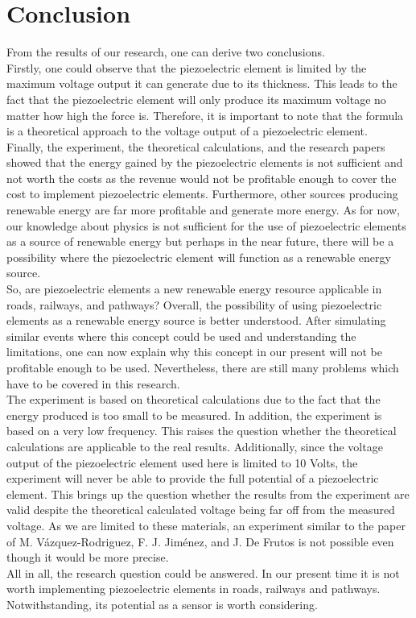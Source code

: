 \section{Conclusion}

From the results of our research, one can derive two conclusions.\\
Firstly, one could observe that the piezoelectric element is limited by the maximum voltage output it can generate due to its thickness. This leads to the fact that the piezoelectric element will only produce its maximum voltage no matter how high the force is. Therefore, it is important to note that the formula is a theoretical approach to the voltage output of a piezoelectric element.\\
Finally, the experiment, the theoretical calculations, and the research papers showed that the energy gained by the piezoelectric elements is not sufficient and not worth the costs as the revenue would not be profitable enough to cover the cost to implement piezoelectric elements. Furthermore, other sources producing renewable energy are far more profitable and generate more energy. As for now, our knowledge about physics is not sufficient for the use of piezoelectric elements as a source of renewable energy but perhaps in the near future, there will be a possibility where the piezoelectric element will function as a renewable energy source.\\
So, are piezoelectric elements a new renewable energy resource applicable in roads, railways, and pathways? Overall, the possibility of using piezoelectric elements as a renewable energy source is better understood. After simulating similar events where this concept could be used and understanding the limitations, one can now explain why this concept in our present will not be profitable enough to be used. Nevertheless, there are still many problems which have to be covered in this research.\\
The experiment is based on theoretical calculations due to the fact that the energy produced is too small to be measured. In addition, the experiment is based on a very low frequency. This raises the question whether the theoretical calculations are applicable to the real results. Additionally, since the voltage output of the piezoelectric element used here is limited to 10 Volts, the experiment will never be able to provide the full potential of a piezoelectric element. This brings up the question whether the results from the experiment are valid despite the theoretical calculated voltage being far off from the measured voltage. As we are limited to these materials, an experiment similar to the paper of M. Vázquez-Rodriguez, F. J. Jiménez, and J. De Frutos is not possible even though it would be more precise.\\
All in all, the research question could be answered. In our present time it is not worth implementing piezoelectric elements in roads, railways and pathways. Notwithstanding, its potential as a sensor is worth considering.